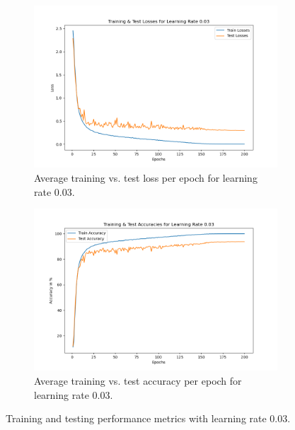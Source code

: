 \begin{figure}[H]
    \centering
    \begin{subfigure}[t]{0.48\textwidth}
        \centering
        \includegraphics[width=\textwidth]{assignment_1/report/images/ex_2_losses_003.png}
        \caption{Average training vs. test loss per epoch for learning rate 0.03.}
    \end{subfigure}
    \hfill
    \begin{subfigure}[t]{0.48\textwidth}
        \centering
        \includegraphics[width=\textwidth]{assignment_1/report/images/ex_2_accuracies_003.png}
        \caption{Average training vs. test accuracy per epoch for learning rate 0.03.}
    \end{subfigure}
    \caption{Training and testing performance metrics with learning rate 0.03.}
\end{figure}


